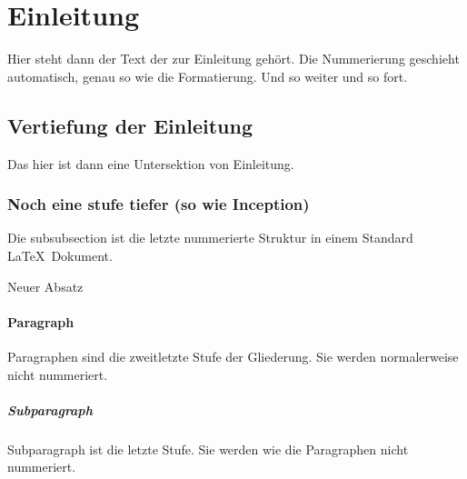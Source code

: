 \documentclass[10pt, a4paper]{article}
\begin{document}
\tableofcontents

\newpage

\section{Einleitung}
Hier steht dann der Text der zur Einleitung gehört. Die Nummerierung geschieht automatisch, genau so wie die Formatierung. Und so weiter und so fort.

\subsection{Vertiefung der Einleitung}
Das hier ist dann eine Untersektion von Einleitung.

\subsubsection{Noch eine stufe tiefer (so wie Inception)}
Die subsubsection ist die letzte nummerierte Struktur in einem Standard \LaTeX\ Dokument.

Neuer Absatz

\paragraph{Paragraph}
Paragraphen sind die zweitletzte Stufe der Gliederung. Sie werden normalerweise nicht nummeriert.

\subparagraph{Subparagraph}
Subparagraph ist die letzte Stufe. Sie werden wie die Paragraphen nicht nummeriert.
\end{document}
